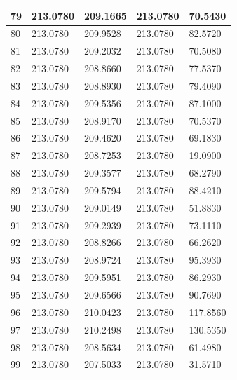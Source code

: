 \begin{longtable}{|l|l|l|l|l|}
79 & 213.0780 & 209.1665 & 213.0780 & 70.5430 \\\hline
80 & 213.0780 & 209.9528 & 213.0780 & 82.5720 \\\hline
81 & 213.0780 & 209.2032 & 213.0780 & 70.5080 \\\hline
82 & 213.0780 & 208.8660 & 213.0780 & 77.5370 \\\hline
83 & 213.0780 & 208.8930 & 213.0780 & 79.4090 \\\hline
84 & 213.0780 & 209.5356 & 213.0780 & 87.1000 \\\hline
85 & 213.0780 & 208.9170 & 213.0780 & 70.5370 \\\hline
86 & 213.0780 & 209.4620 & 213.0780 & 69.1830 \\\hline
87 & 213.0780 & 208.7253 & 213.0780 & 19.0900 \\\hline
88 & 213.0780 & 209.3577 & 213.0780 & 68.2790 \\\hline
89 & 213.0780 & 209.5794 & 213.0780 & 88.4210 \\\hline
90 & 213.0780 & 209.0149 & 213.0780 & 51.8830 \\\hline
91 & 213.0780 & 209.2939 & 213.0780 & 73.1110 \\\hline
92 & 213.0780 & 208.8266 & 213.0780 & 66.2620 \\\hline
93 & 213.0780 & 208.9724 & 213.0780 & 95.3930 \\\hline
94 & 213.0780 & 209.5951 & 213.0780 & 86.2930 \\\hline
95 & 213.0780 & 209.6566 & 213.0780 & 90.7690 \\\hline
96 & 213.0780 & 210.0423 & 213.0780 & 117.8560 \\\hline
97 & 213.0780 & 210.2498 & 213.0780 & 130.5350 \\\hline
98 & 213.0780 & 208.5634 & 213.0780 & 61.4980 \\\hline
99 & 213.0780 & 207.5033 & 213.0780 & 31.5710 \\\hline
\end{longtable}
